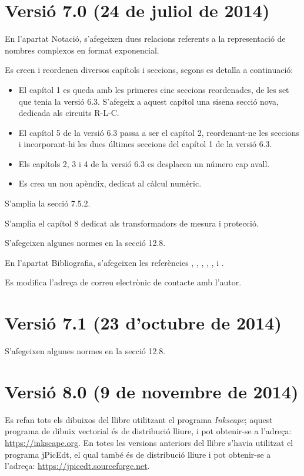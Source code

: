 \section*{Versió 7.0 (24 de juliol de 2014)}

En l'apartat Notació, s'afegeixen dues  relacions referents a la representació de nombres complexos en format exponencial.

Es creen i reordenen diversos capítols i seccions, segons es detalla a continuació:
\begin{itemize}
   \item El capítol 1 es queda amb les primeres cinc seccions reordenades, de les set que tenia la versió 6.3. S'afegeix a aquest capítol una sisena secció nova, dedicada als circuits R-L-C.
   \item El capítol 5 de la versió 6.3 passa a ser el capítol 2, reordenant-ne les  seccions i incorporant-hi les dues últimes seccions del capítol 1 de la versió 6.3.
   \item Els capítols 2, 3 i 4  de la versió 6.3 es desplacen un número cap avall.
   \item Es crea un nou apèndix, dedicat al càlcul numèric.
\end{itemize}

S'amplia la secció 7.5.2.

S'amplia el capítol 8 dedicat als transformadors de mesura i protecció.

S'afegeixen algunes normes en la secció 12.8.

En l'apartat Bibliografia, s'afegeixen les referències \cite{GOM}, \cite{SPK}, \cite{JDH}, \cite{EJB},  \cite{PMA}, \cite{MAI} i \cite{KNU}.

Es modifica l'adreça de correu electrònic de contacte amb l'autor.


\section*{Versió 7.1 (23 d'octubre de 2014)}

S'afegeixen algunes normes en la secció 12.8.


\section*{Versió 8.0 (9 de novembre de 2014)}

Es refan tots els dibuixos del llibre utilitzant el programa \emph{Inkscape}; aquest programa de dibuix vectorial és de distribució lliure, i pot obtenir-se a l'adreça: \href{https://inkscape.org/}{https:/\!\!/inkscape.org}. En totes les versions anteriors del llibre s'havia utilitzat el programa jPicEdt, el qual també és de distribució lliure i pot obtenir-se a l'adreça: \href{https://jpicedt.sourceforge.net//}{https:/\!\!/jpicedt.sourceforge.net}.

